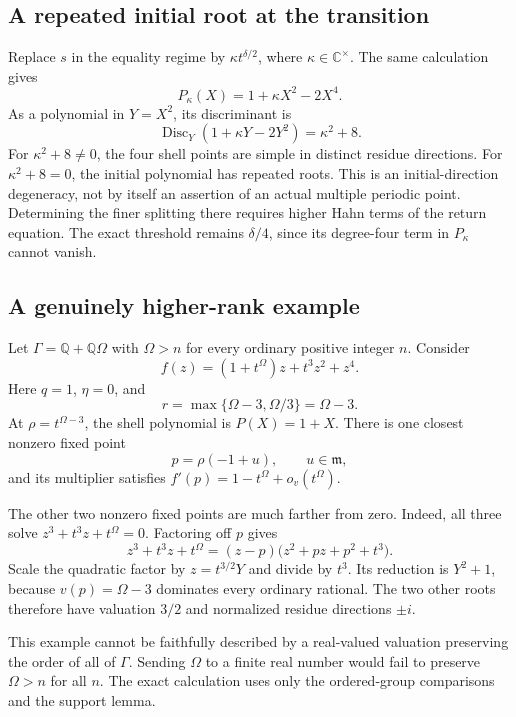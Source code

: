 \documentclass[11pt,letterpaper]{article}
\numberwithin{equation}{section}
\theoremstyle{plain}
\theoremstyle{definition}
\theoremstyle{remark}
\newcommand{\C}{\mathbb C}
\newcommand{\Q}{\mathbb Q}
\newcommand{\mm}{\mathfrak m}
\newcommand{\smallo}{o_v}
\DeclareMathOperator{\Disc}{Disc}
\begin{document}
\subsection{A repeated initial root at the transition}

Replace $s$ in the equality regime by $\kappa t^{\delta/2}$, where
$\kappa\in\C^\times$. The same calculation gives
\[
 P_\kappa(X)=1+\kappa X^2-2X^4.
\]
As a polynomial in $Y=X^2$, its discriminant is
\[
 \Disc_Y(1+\kappa Y-2Y^2)=\kappa^2+8.
\]
For $\kappa^2+8\ne0$, the four shell points are simple in distinct residue
directions. For $\kappa^2+8=0$, the initial polynomial has repeated roots.
This is an initial-direction degeneracy, not by itself an assertion of an
actual multiple periodic point. Determining the finer splitting there
requires higher Hahn terms of the return equation. The exact threshold
remains $\delta/4$, since its degree-four term in $P_\kappa$ cannot vanish.

\subsection{A genuinely higher-rank example}\label{subsec:rank2}

Let $\Gamma=\Q+\Q\Omega$ with $\Omega>n$ for every ordinary positive
integer $n$. Consider
\begin{equation}\label{eq:rank2}
 f(z)=(1+t^\Omega)z+t^3z^2+z^4.
\end{equation}
Here $q=1$, $\eta=0$, and
\[
 r=\max\{\Omega-3,\Omega/3\}=\Omega-3.
\]
At $\rho=t^{\Omega-3}$, the shell polynomial is $P(X)=1+X$. There is
one closest nonzero fixed point
\[
 p=\rho(-1+u),\qquad u\in\mm,
\]
and its multiplier satisfies $f'(p)=1-t^\Omega+\smallo(t^\Omega)$.

The other two nonzero fixed points are much farther from zero. Indeed,
all three solve $z^3+t^3z+t^\Omega=0$. Factoring off $p$ gives
\[
 z^3+t^3z+t^\Omega
  =(z-p)\bigl(z^2+pz+p^2+t^3\bigr).
\]
Scale the quadratic factor by $z=t^{3/2}Y$ and divide by $t^3$.
Its reduction is $Y^2+1$, because $v(p)=\Omega-3$ dominates every
ordinary rational. The two other roots therefore have valuation $3/2$ and
normalized residue directions $\pm i$.

This example cannot be faithfully described by a real-valued valuation
preserving the order of all of $\Gamma$. Sending $\Omega$ to a finite real
number would fail to preserve $\Omega>n$ for all $n$. The exact calculation
uses only the ordered-group comparisons and the support lemma.
\end{document}
